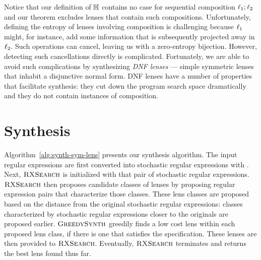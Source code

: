 \documentclass[acmsmall,screen,anonymous]{acmart}
\begin{document}
Notice that our definition of $\mathbb{H}$ contains no case for sequential
composition $\mathit{\ell}_1 ; \mathit{\ell}_2$ and our theorem excludes lenses that contain
such compositions. Unfortunately, defining the entropy of lenses involving
composition is challenging because $\mathit{\ell}_1$ might, for instance, add some
information that is subsequently projected away in $\mathit{\ell}_2$. Such operations
can cancel, leaving us with a zero-entropy bijection. However, detecting such
cancellations directly is complicated. Fortunately, we are able to avoid such
complications by synthesizing \emph{DNF lenses} — simple symmetric lenses that
inhabit a disjunctive normal form. DNF lenses have a number of properties that
facilitate synthesis: they cut down the program search space dramatically and
they do not contain instances of composition.


\section{Synthesis}
\label{sec:synthesis}
Algorithm~\ref{alg:synth-sym-lens} presents our synthesis algorithm. The
input regular expressions are first converted into stochastic regular
expressions with \ToStochastic. Next, $\RXSearch$ is initialized with that pair
of stochastic regular expressions. $\RXSearch$ then proposes candidate classes
of lenses by proposing regular expression pairs that characterize those classes.
These lens classes are proposed based on the distance from the original
stochastic regular expressions: classes characterized by stochastic regular
expressions closer to the originals are proposed earlier. $\GreedySynth$
greedily finds a low cost lens within each proposed lens class, if there is one
that satisfies the specification. These lenses are then provided to $\RXSearch$.
Eventually, $\RXSearch$ terminates and returns the best lens found thus far.
\end{document}
